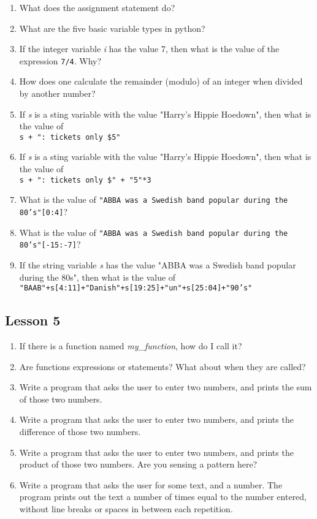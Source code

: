 \documentclass[a4paper,11pt]{article}
\begin{document}
\begin{enumerate}
	\item What does the assignment statement do?
	\item What are the five basic variable types in python?
	\item If the integer variable \textit{i} has the value 7, then what is    the value of the expression 
\texttt{7/4}. Why?
	\item How does one calculate the remainder (modulo) of an integer when    divided by another number?
	\item If \textit{s} is a sting variable with the value "Harry's Hippie    Hoedown", then what is the value of
\\
\texttt{s + ": tickets only    \$5"}
	\item If \textit{s} is a sting variable with the value "Harry's Hippie    Hoedown", then what is the value of
\\
\texttt{s + ": tickets only    \$" + "5"*3}
	\item What is the value of 
\texttt{"ABBA was a Swedish band popular during the    80's"[0:4]}?
	\item What is the value of 
\texttt{"ABBA was a Swedish band popular during the    80's"[-15:-7]}?
	\item If the string variable \textit{s} has the value "ABBA was a    Swedish band popular during the 80s", then what is the value of 
\\
\texttt{"BAAB"+s[4:11]+"Danish"+s[19:25]+"un"+s[25:04]+"90's"}
\end{enumerate}

\subsection{Lesson 5}

\begin{enumerate}
	\item If there is a function named \textit{my\_function}, how do I call    it?
	\item Are functions expressions or statements? What about when they    are called?
	\item Write a program that asks the user to enter two numbers, and    prints the sum of those two numbers.
	\item Write a program that asks the user to enter two numbers, and    prints the difference of those two numbers.
	\item Write a program that asks the user to enter two numbers, and    prints the product of those two numbers. Are you sensing a pattern    here?
	\item Write a program that asks the user for some text, and a number.    The program prints out the text a number of times equal to the    number entered, without line breaks or spaces in between each    repetition.
\end{enumerate}
\end{document}
